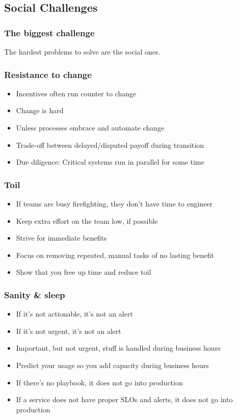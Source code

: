 \documentclass[t]{beamer}
\begin{document}
\subsection{Social Challenges}

\begin{frame}
	\frametitle{The biggest challenge}
		\begin{center}
			\vfill
			The hardest problems to solve are the social ones.
			\vfill
		\end{center}
\end{frame}

\begin{frame}
	\frametitle{Resistance to change}
	\begin{itemize}
		\item Incentives often run counter to change
		\item Change is hard
		\item Unless processes embrace and automate change
		\item Trade-off between delayed/disputed payoff during transition
		\item Due diligence: Critical systems run in parallel for some time
	\end{itemize}
\end{frame}

\begin{frame}
	\frametitle{Toil}
	\begin{itemize}
		\item If teams are busy firefighting, they don't have time to engineer
		\item Keep extra effort on the team low, if possible
		\item Strive for immediate benefits
		\item Focus on removing repeated, manual tasks of no lasting benefit
		\item Show that you free up time and reduce toil
	\end{itemize}
\end{frame}

\begin{frame}
	\frametitle{Sanity \& sleep}
	\begin{itemize}
		\item If it's not actionable, it's not an alert
		\item If it's not urgent, it's not an alert
		\item Important, but not urgent, stuff is handled during business hours
		\item Predict your usage so you add capacity during business hours
		\item If there's no playbook, it does not go into production
		\item If a service does not have proper SLOs and alerts, it does not go into production
	\end{itemize}
\end{frame}
\end{document}
